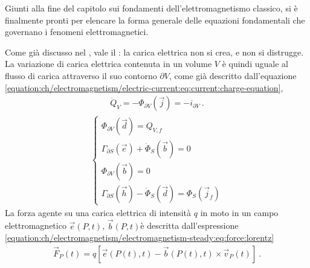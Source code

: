 \documentclass[letterpaper,10pt,italian]{jupyterBook}
\begin{document}
\sphinxAtStartPar
Giunti alla fine del capitolo sui fondamenti dell’elettromagnetismo classico, si è finalmente pronti per elencare la forma generale delle equazioni fondamentali che governano i fenomeni elettromagnetici.

\sphinxAtStartPar
{} Come già discusso nel {\hyperref[\detokenize{ch/electromagnetism/electric-current:physics-hs-electromagnetism-electric-current}]{}}, vale il {\hyperref[\detokenize{ch/electromagnetism/electric-current:physics-hs-electromagnetism-charge-conservation}]{}}: la carica elettrica non si crea, e non si distrugge. La variazione di carica elettrica contenuta in un volume \(V\) è quindi uguale al flusso di carica attraverso il suo contorno \(\partial V\), come già descritto dall’equazione \eqref{equation:ch/electromagnetism/electric-current:eq:current:charge-equation},
\begin{equation}\label{equation:ch/electromagnetism/electromagnetism-general:eq:principles:charge}
\begin{split}\dot{Q}_V = - \Phi_{\partial V}(\vec{j}) = - i_{\partial V} \ .\end{split}
\end{equation}
\sphinxAtStartPar
{}
\begin{equation}\label{equation:ch/electromagnetism/electromagnetism-general:eq:principles:maxwell}
\begin{split}\begin{cases}
  \Phi_{\partial V}(\vec{d}) = Q_{V,f} \\
  \Gamma_{\partial S}(\vec{e}) + \dot{\Phi}_S(\vec{b}) = 0 \\
  \Phi_{\partial V}(\vec{b}) = 0 \\
  \Gamma_{\partial S}(\vec{h}) - \dot{\Phi}_S(\vec{d}) = \Phi_S(\vec{j}_f)
\end{cases}\end{split}
\end{equation}
\sphinxAtStartPar
{} La forza agente su una carica elettrica di intensità \(q\) in moto in un campo elettromagnetico \(\vec{e}(P,t)\), \(\vec{b}(P, t)\)è descritta dall’espressione \eqref{equation:ch/electromagnetism/electromagnetism-steady:eq:force:lorentz}
\begin{equation}\label{equation:ch/electromagnetism/electromagnetism-general:eq:principles:lorentz}
\begin{split}\vec{F}_P(t) = q \left[ \vec{e}(P(t), t) - \vec{b}(P(t), t) \times \vec{v}_P(t) \right] \ .\end{split}
\end{equation}
\end{document}
